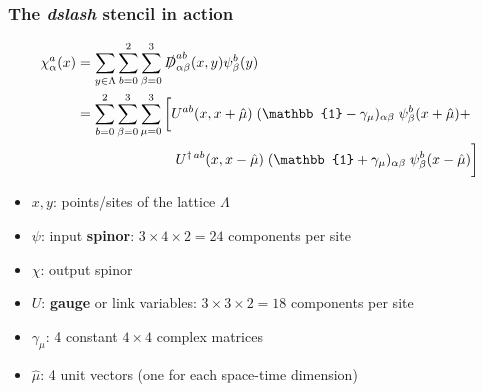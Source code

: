 \documentclass{beamer}
\begin{document}
  \begin{frame}
    \frametitle{The \textit{dslash} stencil in action}

    \begin{align*}
      \nonumber
      \chi^a_\alpha(x) &= \sum_{y \in \Lambda} \sum_{b = 0}^2 \sum_{\beta = 0}^3 \slashed D^{ab}_{\alpha \beta}(x,y) \psi^b_\beta(y) \\
      &= \sum_{b = 0}^2 \sum_{\beta = 0}^3 \sum_{\mu=0}^3
      \bigg[
        U^{ab}(x,x+\hat\mu) \; (\mathbb{1}-\gamma_\mu)_{\alpha\beta} \; \psi^b_\beta(x+\hat\mu) + \\
        \nonumber
        &\hspace{25.0mm}
        U^{\dagger\, ab}(x,x-\hat\mu) \; (\mathbb{1}+\gamma_\mu)_{\alpha\beta} \; \psi^b_\beta(x-\hat\mu)
      \bigg]
    \end{align*}

    \begin{itemize}
      \item $x,y$: points/sites of the lattice $\Lambda$\\
      \item $\psi$: input \textbf{spinor}: $3 \times 4 \times 2 = 24$ components per site\\
      \item $\chi$: output spinor\\
      \item $U$: \textbf{gauge} or link variables: $3 \times 3 \times 2 = 18$ components per site\\
      \item $\gamma_\mu$: 4 constant $4 \times 4$ complex matrices
      \item $\hat \mu$: 4 unit vectors (one for each space-time dimension)
    \end{itemize}

  \end{frame}

\end{document}
